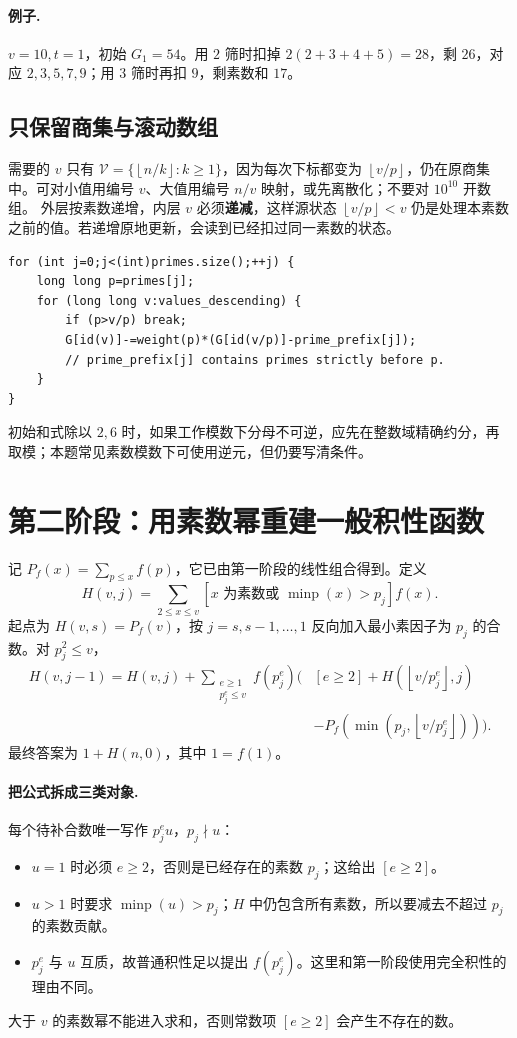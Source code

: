 \documentclass[UTF8,a4paper,11pt,twoside,openright,fontset=fandol]{ctexbook}
\theoremstyle{definition}
\newcommand{\floor}[1]{\left\lfloor #1\right\rfloor}
\begin{document}
\paragraph{例子.} $v=10,t=1$，初始 $G_1=54$。用 $2$ 筛时扣掉 $2(2+3+4+5)=28$，剩 $26$，对应 $2,3,5,7,9$；用 $3$ 筛时再扣 $9$，剩素数和 $17$。

\subsection{只保留商集与滚动数组}
需要的 $v$ 只有 $\mathcal V=\{\floor{n/k}:k\ge1\}$，因为每次下标都变为 $\floor{v/p}$，仍在原商集中。可对小值用编号 $v$、大值用编号 $n/v$ 映射，或先离散化；不要对 $10^{10}$ 开数组。
外层按素数递增，内层 $v$ 必须\textbf{递减}，这样源状态 $\floor{v/p}<v$ 仍是处理本素数之前的值。若递增原地更新，会读到已经扣过同一素数的状态。
\begin{lstlisting}
for (int j=0;j<(int)primes.size();++j) {
    long long p=primes[j];
    for (long long v:values_descending) {
        if (p>v/p) break;
        G[id(v)]-=weight(p)*(G[id(v/p)]-prime_prefix[j]);
        // prime_prefix[j] contains primes strictly before p.
    }
}
\end{lstlisting}
初始和式除以 $2,6$ 时，如果工作模数下分母不可逆，应先在整数域精确约分，再取模；本题常见素数模数下可使用逆元，但仍要写清条件。


\section{第二阶段：用素数幂重建一般积性函数}
记 $P_f(x)=\sum_{p\le x}f(p)$，它已由第一阶段的线性组合得到。定义
\[
 H(v,j)=\sum_{2\le x\le v}
 [x\text{ 为素数或 }\operatorname{minp}(x)>p_j]f(x).
\]
起点为 $H(v,s)=P_f(v)$，按 $j=s,s-1,\ldots,1$ 反向加入最小素因子为 $p_j$ 的合数。对 $p_j^2\le v$，
\[
\begin{aligned}
 H(v,j-1)=H(v,j)+\sum_{\substack{e\ge1\\p_j^e\le v}} f(p_j^e)
 \biggl(&[e\ge2]+H(\floor{v/p_j^e},j)\\
 &-P_f(\min(p_j,\floor{v/p_j^e}))\biggr).
\end{aligned}
\]
最终答案为 $1+H(n,0)$，其中 $1=f(1)$。


\paragraph{把公式拆成三类对象.}
每个待补合数唯一写作 $p_j^e u$，$p_j\nmid u$：
\begin{itemize}
\item $u=1$ 时必须 $e\ge2$，否则是已经存在的素数 $p_j$；这给出 $[e\ge2]$。
\item $u>1$ 时要求 $\operatorname{minp}(u)>p_j$；$H$ 中仍包含所有素数，所以要减去不超过 $p_j$ 的素数贡献。
\item $p_j^e$ 与 $u$ 互质，故普通积性足以提出 $f(p_j^e)$。这里和第一阶段使用完全积性的理由不同。
\end{itemize}
大于 $v$ 的素数幂不能进入求和，否则常数项 $[e\ge2]$ 会产生不存在的数。
\end{document}
